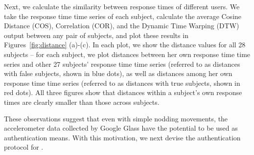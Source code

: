 Next, we calculate the similarity between response times of different users. We take the response time time series of each subject, calculate the average Cosine Distance (COS), Correlation (COR), and the Dynamic Time Warping (DTW)~\cite{dtw} output between any pair of subjects, and plot these results in Figures~\ref{fig:distance} (a)-(c). In each plot, we show the distance values for all 28 subjects -- for each subject, we plot distances between her own response time time series and other 27 subjects' response time time series (referred to as distances with false subjects, shown in blue dots), as well as distances among her own response time time series (referred to as distances with true subjects, shown in red dots). All three figures show that distances within a subject's own response times are clearly smaller than those across subjects.

These observations suggest that even with simple nodding movements, the accelerometer data collected by Google Glass have the potential to be used as authentication means. With this motivation, we next devise the authentication protocol for \systemname.
